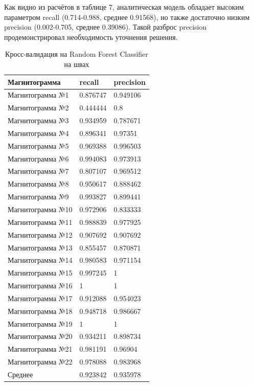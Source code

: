 \documentclass[a4paper,article,14pt]{extarticle}
\begin{document}
Как видно из расчётов в таблице 7, аналитическая модель обладает высоким параметром recall (0.714-0.988, среднее 0.91568), но также достаточно низким precision (0.002-0.705, среднее 0.39086). 
Такой разброс precision продемонстрировал необходимость уточнения решения.

\begin{center}
    \begin{longtable}{|p{5cm}|p{3cm}|p{3cm}|}
        \caption{Кросс-валидация на Random Forest Classifier на швах}\\\hline
        Магнитограмма & recall & precision \\ \hline
        Магнитограмма №1 & 0.876747 & 0.949106 \\ \hline
        Магнитограмма №2 & 0.444444 & 0.8 \\ \hline
        Магнитограмма №3 & 0.934959 & 0.787671 \\ \hline
        Магнитограмма №4 & 0.896341 & 0.97351 \\ \hline
        Магнитограмма №5 & 0.969388 & 0.996503 \\ \hline
        Магнитограмма №6 & 0.994083 & 0.973913 \\ \hline
        Магнитограмма №7 & 0.807107 & 0.969512 \\ \hline
        Магнитограмма №8 & 0.950617 & 0.888462 \\ \hline
        Магнитограмма №9 & 0.993827 & 0.899441 \\ \hline
        Магнитограмма №10 & 0.972906 & 0.833333 \\ \hline
        Магнитограмма №11 & 0.988839 & 0.977925 \\ \hline
        Магнитограмма №12 & 0.907692 & 0.907692 \\ \hline
        Магнитограмма №13 & 0.855457 & 0.870871 \\ \hline
        Магнитограмма №14 & 0.980583 & 0.971154 \\ \hline
        Магнитограмма №15 & 0.997245 & 1 \\ \hline
        Магнитограмма №16 & 1 & 1 \\ \hline
        Магнитограмма №17 & 0.912088 & 0.954023 \\ \hline
        Магнитограмма №18 & 0.948718 & 0.986667 \\ \hline
        Магнитограмма №19 & 1 & 1 \\ \hline
        Магнитограмма №20 & 0.934211 & 0.898734 \\ \hline
        Магнитограмма №21 & 0.981191 & 0.96904 \\ \hline
        Магнитограмма №22 & 0.978088 & 0.983968 \\ \hline
        Среднее & 0.923842 & 0.935978 \\ \hline
    \end{longtable}
\end{center}
\end{document}
